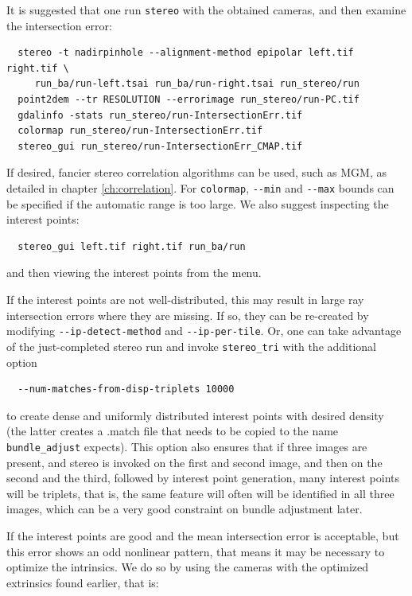 It is suggested that one run \texttt{stereo} with the obtained cameras, 
and then examine the intersection error:

\begin{verbatim}
  stereo -t nadirpinhole --alignment-method epipolar left.tif right.tif \
     run_ba/run-left.tsai run_ba/run-right.tsai run_stereo/run 
  point2dem --tr RESOLUTION --errorimage run_stereo/run-PC.tif
  gdalinfo -stats run_stereo/run-IntersectionErr.tif
  colormap run_stereo/run-IntersectionErr.tif
  stereo_gui run_stereo/run-IntersectionErr_CMAP.tif
\end{verbatim}

If desired, fancier stereo correlation algorithms can be used, such as MGM, as detailed in  
chapter \ref{ch:correlation}. For \texttt{colormap}, \texttt{-\/-min} and \texttt{-\/-max} 
bounds can be specified if the automatic range is too large. We also suggest inspecting
the interest points:
\begin{verbatim}
  stereo_gui left.tif right.tif run_ba/run
\end{verbatim}
and then viewing the interest points from the menu. 

If the interest points are not well-distributed, this may result in large ray intersection errors
where they are missing. If so, they can be re-created by modifying \texttt{-\/-ip-detect-method}
and \texttt{-\/-ip-per-tile}. Or, one can take advantage of the just-completed stereo run
and invoke \texttt{stereo\_tri} with the additional option 
\begin{verbatim} 
  --num-matches-from-disp-triplets 10000
\end{verbatim}

to create dense and uniformly distributed interest points with desired density
(the latter creates a .match file that needs to be copied to the name
\texttt{bundle\_adjust} expects). This option also ensures that if three
images are present, and stereo is invoked on the first and second image,
and then on the second and the third, followed by interest point generation,
many interest points will be triplets, that is, the same feature will often
will be identified in all three images, which
can be a very good constraint on bundle adjustment later.

If the interest points are good and the mean intersection error is
acceptable, but this error shows an odd nonlinear pattern, that means
it may be necessary to optimize the intrinsics. We do so by using the
cameras with the optimized extrinsics found earlier, that is:

